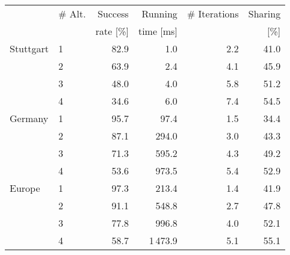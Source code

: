 \begin{tabular}{llrrrr}
\toprule
 & \# Alt. & Success   & Running   & \# Iterations & Sharing \\
 &         & rate [\%] & time [ms] &               &    [\%] \\
\midrule
Stuttgart & 1 &     82.9 &              1.0 &        2.2 &             41.0 \\
       & 2 &     63.9 &              2.4 &        4.1 &             45.9 \\
       & 3 &     48.0 &              4.0 &        5.8 &             51.2 \\
       & 4 &     34.6 &              6.0 &        7.4 &             54.5 \\
\addlinespace Germany & 1 &     95.7 &             97.4 &        1.5 &             34.4 \\
       & 2 &     87.1 &            294.0 &        3.0 &             43.3 \\
       & 3 &     71.3 &            595.2 &        4.3 &             49.2 \\
       & 4 &     53.6 &            973.5 &        5.4 &             52.9 \\
\addlinespace Europe & 1 &     97.3 &            213.4 &        1.4 &             41.9 \\
       & 2 &     91.1 &            548.8 &        2.7 &             47.8 \\
       & 3 &     77.8 &            996.8 &        4.0 &             52.1 \\
       & 4 &     58.7 &           1\,473.9 &        5.1 &             55.1 \\
\bottomrule
\end{tabular}

